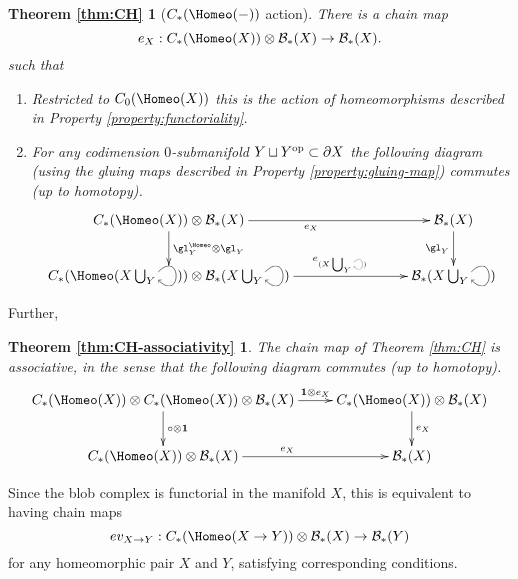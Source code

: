 \newtheorem*{thm:CH}{Theorem \ref{thm:CH}}

\begin{thm:CH}[$C_*(\Homeo(-))$ action]
There is a chain map
\begin{equation*}
e_X: \CH{X} \tensor \bc_*(X) \to \bc_*(X).
\end{equation*}
such that
\begin{enumerate}
\item Restricted to $C_0(\Homeo(X))$ this is the action of homeomorphisms described in Property \ref{property:functoriality}. 

\item For
any codimension $0$-submanifold $Y \sqcup Y^\text{op} \subset \partial X$ the following diagram
(using the gluing maps described in Property \ref{property:gluing-map}) commutes (up to homotopy).
\begin{equation*}
\xymatrix@C+2cm{
     \CH{X} \otimes \bc_*(X)
        \ar[r]_{e_{X}}  \ar[d]^{\gl^{\Homeo}_Y \otimes \gl_Y}  &
            \bc_*(X) \ar[d]_{\gl_Y} \\
     \CH{X \bigcup_Y \selfarrow} \otimes \bc_*(X \bigcup_Y \selfarrow) \ar[r]^<<<<<<<<<<<<{e_{(X \bigcup_Y \scalebox{0.5}{\selfarrow})}}    & \bc_*(X \bigcup_Y \selfarrow)
}
\end{equation*}
\end{enumerate}
\end{thm:CH}

\newtheorem*{thm:CH-associativity}{Theorem \ref{thm:CH-associativity}}


Further,
\begin{thm:CH-associativity}
The chain map of Theorem \ref{thm:CH} is associative, in the sense that the following diagram commutes (up to homotopy).
\begin{equation*}
\xymatrix{
\CH{X} \tensor \CH{X} \tensor \bc_*(X) \ar[r]^<<<<<{\id \tensor e_X} \ar[d]^{\compose \tensor \id} & \CH{X} \tensor \bc_*(X) \ar[d]^{e_X} \\
\CH{X} \tensor \bc_*(X) \ar[r]^{e_X} & \bc_*(X)
}
\end{equation*}
\end{thm:CH-associativity}

Since the blob complex is functorial in the manifold $X$, this is equivalent to having chain maps
$$ev_{X \to Y} : \CH{X \to Y} \tensor \bc_*(X) \to \bc_*(Y)$$
for any homeomorphic pair $X$ and $Y$, 
satisfying corresponding conditions.

